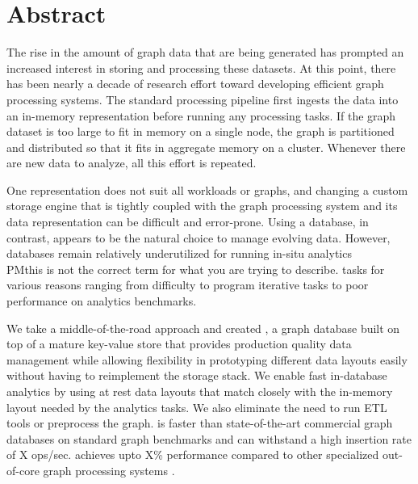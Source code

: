 
\chapter{Abstract}

The rise in the amount of graph data that are being generated has prompted an increased interest in storing and processing these datasets.
At this point, there has been nearly a decade of research effort toward developing efficient graph processing systems.
The standard processing pipeline first ingests the data into an in-memory representation before running any processing tasks.
If the graph dataset is too large to fit in memory on a single node, the graph is partitioned and distributed so that it fits in aggregate memory on a cluster.
Whenever there are new data to analyze, all this effort is repeated.

One representation does not suit all workloads or graphs, and changing a custom storage engine that is tightly coupled with the graph processing system and its data representation can be difficult and error-prone.
Using a database, in contrast, appears to be the natural choice to manage evolving data.
However, databases remain relatively underutilized for running in-situ analytics \\PM{this is not the correct term for what you are trying to describe.} tasks for various reasons ranging from difficulty to program iterative tasks to poor performance on analytics benchmarks.

We take a middle-of-the-road approach and created \project{}, a graph database built on top of a mature key-value store that provides production quality data management while allowing flexibility in prototyping different data layouts easily without having to reimplement the storage stack.
We enable fast in-database analytics by using at rest data layouts that match closely with the in-memory layout needed by the analytics tasks. We also eliminate the need to run ETL tools or preprocess the graph.
\project{} is faster than state-of-the-art commercial graph databases on standard graph benchmarks and can withstand a high insertion rate of X ops/sec.
\project{} achieves upto X\% performance compared to other specialized out-of-core graph processing systems .